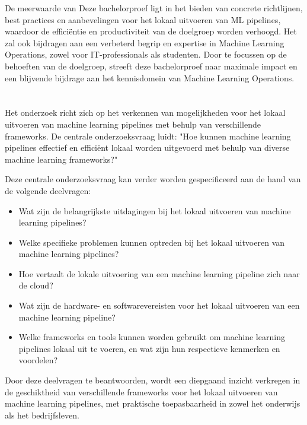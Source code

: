 De meerwaarde van Deze bachelorproef ligt in het bieden van concrete richtlijnen, best practices en aanbevelingen voor het lokaal uitvoeren van ML pipelines, waardoor de efficiëntie en productiviteit van de doelgroep worden verhoogd. Het zal ook bijdragen aan een verbeterd begrip en expertise in Machine Learning Operations, zowel voor IT-professionals als studenten. Door te focussen op de behoeften van de doelgroep, streeft deze bachelorproef naar maximale impact en een blijvende bijdrage aan het kennisdomein van Machine Learning Operations.

\section{}%
\label{sec:onderzoeksvraag}

Het onderzoek richt zich op het verkennen van mogelijkheden voor het lokaal uitvoeren van machine learning pipelines met behulp van verschillende frameworks. De centrale onderzoeksvraag luidt: "Hoe kunnen machine learning pipelines effectief en efficiënt lokaal worden uitgevoerd met behulp van diverse machine learning frameworks?"

Deze centrale onderzoeksvraag kan verder worden gespecificeerd aan de hand van de volgende deelvragen:
\begin{itemize}
  \item Wat zijn de belangrijkste uitdagingen bij het lokaal uitvoeren van machine learning pipelines?
  \item Welke specifieke problemen kunnen optreden bij het lokaal uitvoeren van machine learning pipelines?
  \item Hoe vertaalt de lokale uitvoering van een machine learning pipeline zich naar de cloud?
  \item Wat zijn de hardware- en softwarevereisten voor het lokaal uitvoeren van een machine learning pipeline?
  \item Welke frameworks en tools kunnen worden gebruikt om machine learning pipelines lokaal uit te voeren, en wat zijn hun respectieve kenmerken en voordelen?
\end{itemize}

Door deze deelvragen te beantwoorden, wordt een diepgaand inzicht verkregen in de geschiktheid van verschillende frameworks voor het lokaal uitvoeren van machine learning pipelines, met praktische toepasbaarheid in zowel het onderwijs als het bedrijfsleven.

\section{}%
\label{sec:onderzoeksdoelstelling}

